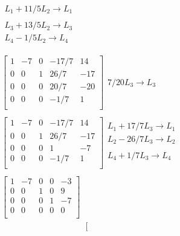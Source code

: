 \documentclass[]{article}
\begin{document}
\[\begin{array}{l}
\begin{array}{l}
 L_{1} + 11/5 L_{2} \rightarrow L_{1} \\ 
\\ 
 L_{3} + 13/5 L_{2} \rightarrow L_{3} \\ 
 L_{4} - 1/5 L_{2} \rightarrow L_{4} \\ 
\end{array}\\
 \\
\left[
\begin{array}{rrrr|r}
1 & -7 & 0 & -17/7 & 14 \\ 
0 & 0 & 1 & 26/7 & -17 \\ 
0 & 0 & 0 & 20/7 & -20 \\ 
0 & 0 & 0 & -1/7 & 1 \\ 
\end{array}
\right]\begin{array}{l}
\\ 
\\ 
7/20 L_{3} \rightarrow L_{3}\\ 
\\ 
\end{array}\\
 \\
\left[
\begin{array}{rrrr|r}
1 & -7 & 0 & -17/7 & 14 \\ 
0 & 0 & 1 & 26/7 & -17 \\ 
0 & 0 & 0 & 1 & -7 \\ 
0 & 0 & 0 & -1/7 & 1 \\ 
\end{array}
\right]\begin{array}{l}
 L_{1} + 17/7 L_{3} \rightarrow L_{1} \\ 
 L_{2} - 26/7 L_{3} \rightarrow L_{2} \\ 
\\ 
 L_{4} + 1/7 L_{3} \rightarrow L_{4} \\ 
\end{array}\\
 \\
\left[
\begin{array}{rrrr|r}
1 & -7 & 0 & 0 & -3 \\ 
0 & 0 & 1 & 0 & 9 \\ 
0 & 0 & 0 & 1 & -7 \\ 
0 & 0 & 0 & 0 & 0 \\ 
\end{array}
\right]
\end{array}
\]\[
\begin{array}{l}
\left[
\begin{array}{rrrr|r}

\end{array}
\end{array}\]
\end{document}
